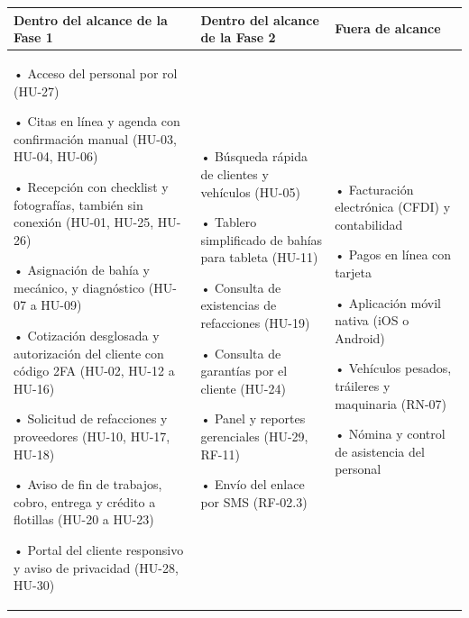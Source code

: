 {\def\LTcaptype{none} %
\begin{longtable}[]{@{}
  >{\raggedright\arraybackslash}p{}
  >{\raggedright\arraybackslash}p{}
  >{\raggedright\arraybackslash}p{}@{}}
\toprule\noalign{}
\begin{minipage}[b]{\linewidth}\raggedright
\textbf{Dentro del alcance de la Fase 1}
\end{minipage} & \begin{minipage}[b]{\linewidth}\raggedright
\textbf{Dentro del alcance de la Fase 2}
\end{minipage} & \begin{minipage}[b]{\linewidth}\raggedright
\textbf{Fuera de alcance}
\end{minipage} \\
\midrule\noalign{}
\endhead
\bottomrule\noalign{}
\endlastfoot
• Acceso del personal por rol (HU-27)

• Citas en línea y agenda con confirmación manual (HU-03, HU-04, HU-06)

• Recepción con checklist y fotografías, también sin conexión (HU-01,
HU-25, HU-26)

• Asignación de bahía y mecánico, y diagnóstico (HU-07 a HU-09)

• Cotización desglosada y autorización del cliente con código 2FA
(HU-02, HU-12 a HU-16)

• Solicitud de refacciones y proveedores (HU-10, HU-17, HU-18)

• Aviso de fin de trabajos, cobro, entrega y crédito a flotillas (HU-20
a HU-23)

• Portal del cliente responsivo y aviso de privacidad (HU-28, HU-30) & •
Búsqueda rápida de clientes y vehículos (HU-05)

• Tablero simplificado de bahías para tableta (HU-11)

• Consulta de existencias de refacciones (HU-19)

• Consulta de garantías por el cliente (HU-24)

• Panel y reportes gerenciales (HU-29, RF-11)

• Envío del enlace por SMS (RF-02.3) & • Facturación electrónica (CFDI)
y contabilidad

• Pagos en línea con tarjeta

• Aplicación móvil nativa (iOS o Android)

• Vehículos pesados, tráileres y maquinaria (RN-07)

• Nómina y control de asistencia del personal \\
\end{longtable}
}

